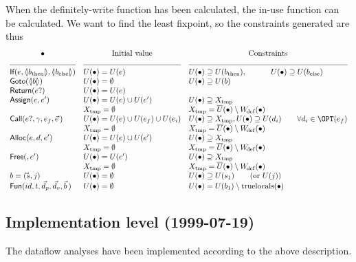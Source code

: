 \begin{docpart}
When the definitely-write function has been calculated, the in-use
function can be calculated. We want to find the least fixpoint, so the
constraints generated are thus
\[
\begin{array}{lll}
  \hfil \bullet & \hfil \mbox{Initial value} & \hfil \mbox{Constraints} \\
  \hrulefill & \hrulefill & \hrulefill \\
  \cons{If}(e,\coreXref{b_{\mathrm{then}}},
  \coreXref{b_{\mathrm{else}}}) & \Use(\bullet) = \Use(e) & \Use(\bullet) \supseteq
  \Use(b_{\mathrm{then}}) ,\hfil \Use(\bullet) \supseteq
  \Use(b_{\mathrm{else}}) \\
  \cons{Goto}(\coreXref b) & \Use(\bullet) = \emptyset & \Use(\bullet) \supseteq \Use(b) \\
  \cons{Return}(e?) & \Use(\bullet) = \Use(e)   \\
  \cons{Assign}(e,e') & \Use(\bullet) = \Use(e) \cup \Use(e') & \Use(\bullet)
  \supseteq X_{\mathrm{tmp}} \\
  & X_{\mathrm{tmp}} = \emptyset & X_{\mathrm{tmp}} =
  \overline{U}(\bullet) \setminus \Wdef(\bullet) \\
  \cons{Call}(e?,\gamma,e_f,\vec e\,)
  & \Use(\bullet) = \Use(e) \cup \Use(e_f) \cup \Use(e_i) 
  & \Use(\bullet) \supseteq X_{\mathrm{tmp}}, \Use(\bullet) \supseteq \Use(d_i) \qquad \forall d_i \in
  \OPT(e_f)\\
  & X_{\mathrm{tmp}} = \emptyset 
  & X_{\mathrm{tmp}} = \overline{U}(\bullet) \setminus \Wdef(\bullet) \\
  \cons{Alloc}(e,d,e') & \Use(\bullet) = \Use(e) \cup \Use(e') & \Use(\bullet)
  \supseteq X_{\mathrm{tmp}} \\ 
  & X_{\mathrm{tmp}} = \emptyset 
  & X_{\mathrm{tmp}} = \overline{U}(\bullet) \setminus \Wdef(\bullet) \\
  \cons{Free}(,e') & \Use(\bullet) = \Use(e') & \Use(\bullet)
  \supseteq X_{\mathrm{tmp}} \\ 
  & X_{\mathrm{tmp}} = \emptyset 
  & X_{\mathrm{tmp}} = \overline{U}(\bullet) \setminus \Wdef(\bullet) \\
  b = (\vec s,j) & \Use(\bullet) = \emptyset & \Use(\bullet) \supseteq
  \Use(s_1) \qquad (\mbox{or } \Use(j)) \\
  \cons{Fun}(id,t,\vec d_p,\vec d_v,\vec b\,)
  & \Use(\bullet) = \emptyset & \Use(\bullet) = \Use(b_1) \setminus
  \trulylocal(\bullet) \\
\end{array}
\]

\subsection{Implementation level (1999-07-19)}
\label{sec:DataflowImplementationLevel}

The dataflow analyses have been implemented according to the above
description.

\end{docpart}

